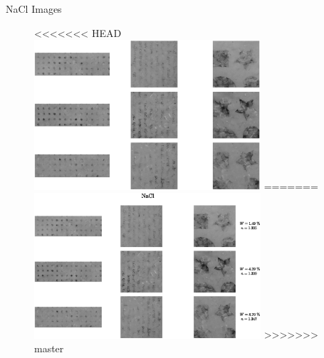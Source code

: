 \documentclass[10pt]{beamer}
\begin{document}
\begin{frame}{NaCl Images}
\begin{figure}
    \centering
<<<<<<< HEAD
    \includegraphics[width = 0.75\textwidth]{figs/NaCl_Imgs002.eps}
=======
    \includegraphics[width = 0.75\textwidth]{figs/NaCl_Imgs.eps}
>>>>>>> master
    \label{NaClImg}
\end{figure}
\end{frame}
\end{document}
